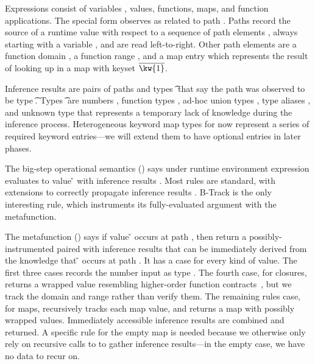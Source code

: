 Expressions \e{} consist of variables \x{}, values,
functions, maps, and function applications.
The special form
\trackE{\e{}}{\inferpath{}}
observes {\e{}} as related to path {\inferpath{}}.
Paths \inferpath{} 
record the source of a runtime value with respect
to a sequence of path elements \inferpth{}, always starting with
a variable \x{}, and are read left-to-right.
Other path elements are
a function domain \dompe{}, 
a function range \rngpe{},
and a map entry {}
which represents the result of looking up {}
in a map with keyset ${\ova{\kw{1}}}$.

Inference results \restwoarrow{\inferpath{}}{\t{}}
are pairs of paths {\inferpath{}} and types \t{}
that say the path \inferpath{} was observed to be 
type \t{}.
Types \t{} are numbers \IntT{}, function types \arrow{\t{}}{\t{}},
ad-hoc union types \Union{\t{}}{\t{}},
type aliases \alias{},
and unknown type \UnknownT{} that represents
a temporary lack of knowledge during the inference process.
Heterogeneous keyword map types \HMappretty{\ova{\kw{}\ \t{}}}
for now represent a series of required keyword entries---we will extend
them to have optional entries in later phases.

The big-step operational semantics
{\opsemtrack{\openv{}}{\e{}}{\v{}}{\res{}}}
()
says under runtime environment \openv{}
expression \e{} evaluates to value \v{}
with inference results \res{}.
Most rules are standard, with extensions to correctly
propagate inference results \res{}.
B-Track is the only interesting rule, which instruments
its fully-evaluated argument with the \trackmetaOp{}
metafunction.

The metafunction \trackmeta{\v{}}{\inferpath{}}{\vp{}}{\res{}} ()
says if value \v{} occurs at path {\inferpath{}}, then return a possibly-instrumented
\vp{} paired with inference results {\res{}} that can be immediately derived
from the knowledge that \v{} occurs at path {\inferpath{}}.
It has a case for every kind of value.
The first three cases records the number input as type {\IntT{}}.
The fourth case, for closures, returns a wrapped value
resembling higher-order function contracts~,
but we track the domain and range rather than verify them.
The remaining rules case, for maps, recursively tracks each map value,
and returns a map with possibly wrapped values.
Immediately accessible inference results are combined
and returned.
A specific rule for the empty map is needed because we otherwise only rely on
recursive calls to \trackEOp{} to gather inference results---in the empty case,
we have no data to recur on.


